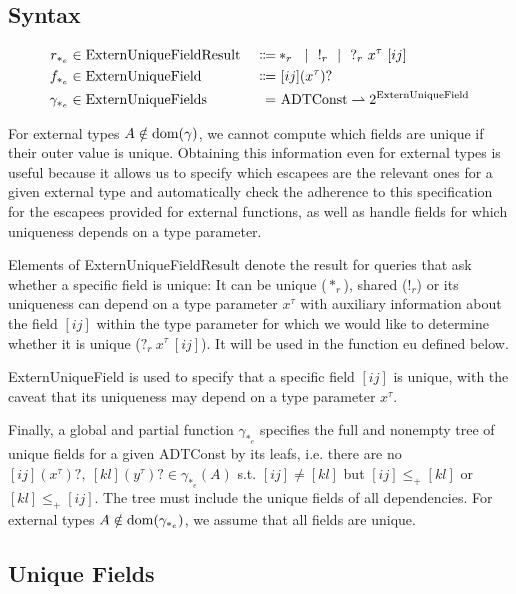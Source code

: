 \newcommand{\ExternUniqueFieldResult}{\mathrm{ExternUniqueFieldResult}}
\newcommand{\ExternUniqueField}{\mathrm{ExternUniqueField}}
\newcommand{\ExternUniqueFields}{\mathrm{ExternUniqueFields}}

\subsection{Syntax}

\begin{alignat*}{3}
	r_{*_e} &\in \ExternUniqueFieldResult\ &\Coloneqq& *_r \sep !_r \sep ?_r\ x^\tau\ [ij] \\
	f_{*_e} &\in \ExternUniqueField\ &\Coloneqq&\ [ij] (x^\tau)? \\
	\gamma_{*_e} &\in \ExternUniqueFields\ &=&\ \ADTConst \rightharpoonup 2^{\ExternUniqueField}
\end{alignat*}

For external types $A \notin \mathrm{dom}(\gamma)$, we cannot compute which fields are unique if their outer value is unique. Obtaining this information even for external types is useful because it allows us to specify which escapees are the relevant ones for a given external type and automatically check the adherence to this specification for the escapees provided for external functions, as well as handle fields for which uniqueness depends on a type parameter.

Elements of ExternUniqueFieldResult denote the result for queries that ask whether a specific field is unique: It can be unique ($*_r$), shared ($!_r$) or its uniqueness can depend on a type parameter $x^\tau$ with auxiliary information about the field $[ij]$ within the type parameter for which we would like to determine whether it is unique ($?_r\ x^\tau\ [ij]$). It will be used in the function eu defined below. 

ExternUniqueField is used to specify that a specific field $[ij]$ is unique, with the caveat that its uniqueness may depend on a type parameter $x^\tau$. 

Finally, a global and partial function $\gamma_{*_e}$ specifies the full and nonempty tree of unique fields for a given ADTConst by its leafs, i.e. there are no $[ij] (x^\tau)?,\ [kl] (y^\tau)? \in \gamma_{*_e}(A)$ s.t. $[ij] \neq [kl]$ but $[ij] \leq_+ [kl]$ or $[kl] \leq_+ [ij]$. The tree must include the unique fields of all dependencies. For external types $A \notin \mathrm{dom}(\gamma_{*_e})$, we assume that all fields are unique.

\subsection{Unique Fields}
